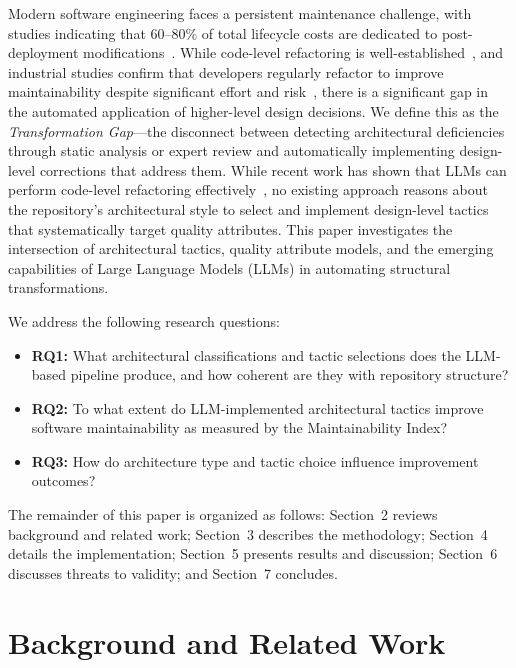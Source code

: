\documentclass[sigconf,review,anonymous]{acmart}
\begin{document}
Modern software engineering faces a persistent maintenance challenge, with studies indicating that 60--80\% of total lifecycle costs are dedicated to post-deployment modifications~\cite{bass2021software}. While code-level refactoring is well-established~\cite{fowler2018refactoring}, and industrial studies confirm that developers regularly refactor to improve maintainability despite significant effort and risk~\cite{kim2014refactoring}, there is a significant gap in the automated application of higher-level design decisions. We define this as the \textit{Transformation Gap}---the disconnect between detecting architectural deficiencies through static analysis or expert review and automatically implementing design-level corrections that address them. While recent work has shown that LLMs can perform code-level refactoring effectively~\cite{changizi2025enhancing, pucho2025refactoring}, no existing approach reasons about the repository's architectural style to select and implement design-level tactics that systematically target quality attributes. This paper investigates the intersection of architectural tactics, quality attribute models, and the emerging capabilities of Large Language Models (LLMs) in automating structural transformations.

We address the following research questions:
\begin{itemize}[nosep]
    \item \textbf{RQ1:} What architectural classifications and tactic selections does the LLM-based pipeline produce, and how coherent are they with repository structure?
    \item \textbf{RQ2:} To what extent do LLM-implemented architectural tactics improve software maintainability as measured by the Maintainability Index?
    \item \textbf{RQ3:} How do architecture type and tactic choice influence improvement outcomes?
\end{itemize}

The remainder of this paper is organized as follows: Section~2 reviews background and related work; Section~3 describes the methodology; Section~4 details the implementation; Section~5 presents results and discussion; Section~6 discusses threats to validity; and Section~7 concludes.

\section{Background and Related Work}
\end{document}
